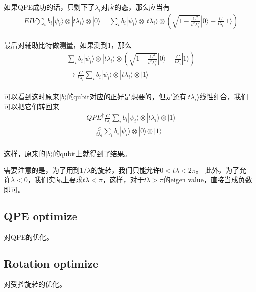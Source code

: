 如果QPE成功的话，只剩下了$\lambda _i$对应的态，那么应当有
\begin{equation}
\begin{split}
&EIV \sum _i b_i |\psi _i\rangle \otimes | t\lambda _i \rangle \otimes |0\rangle = \sum _i b_i |\psi _i\rangle \otimes | t\lambda _i \rangle \otimes \left(\sqrt{1-\frac{C^2}{t^2\lambda _i^2}}|0\rangle + \frac{C}{t\lambda _i}|1\rangle\right)\\
\end{split}
\end{equation}

最后对辅助比特做测量，如果测到$1$，那么
\begin{equation}
\begin{split}
&\sum _i b_i |\psi _i\rangle \otimes | t\lambda _i \rangle \otimes \left(\sqrt{1-\frac{C^2}{t^2\lambda _i^2}}|0\rangle + \frac{C}{t\lambda _i}|1\rangle\right)\\
&\to \frac{C}{t\lambda _i}\sum _i b_i |\psi _i\rangle \otimes | t\lambda _i \rangle \otimes |1\rangle \\
\end{split}
\end{equation}

可以看到这时原来$|b\rangle$的qubit对应的正好是想要的，但是还有$|t\lambda _i\rangle$线性组合，我们可以把它们转回来
\begin{equation}
\begin{split}
&QPE^{\dagger} \frac{C}{t\lambda _i}\sum _i b_i |\psi _i\rangle \otimes | t\lambda _i \rangle \otimes |1\rangle \\
&=\frac{C}{t\lambda _i}\sum _i b_i |\psi _i\rangle \otimes | 0 \rangle \otimes |1\rangle \\
\end{split}
\end{equation}

这样，原来的$|b\rangle$的qubit上就得到了结果。

需要注意的是，为了用到$1/\lambda$的旋转，我们只能允许$0<t\lambda<2\pi$。
此外，为了允许$\lambda <0$，我们实际上要求$t\lambda<\pi$，这样，对于$t\lambda > \pi$的eigen value，直接当成负数即可。

\subsection{\label{sec:hhl.opqpe}QPE optimize}

对QPE的优化。

\subsection{\label{sec:hhl.opqpe}Rotation optimize}

对受控旋转的优化。


